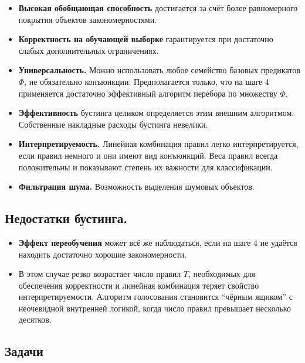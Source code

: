\begin{itemize}
    \item \textbf{Высокая обобщающая способность} достигается за счёт более равномерного покрытия объектов закономерностями.

    \item \textbf{Корректность на обучающей выборке} гарантируется при достаточно слабых дополнительных ограничениях.

    \item \textbf{Универсальность.} Можно использовать любое семейство базовых предикатов $\Phi$, не обязательно конъюнкции. Предполагается только, что на шаге 4 применяется достаточно эффективный алгоритм перебора по множеству $\Phi$.

    \item \textbf{Эффективность} бустинга целиком определяется этим внешним алгоритмом. Собственные накладные расходы бустинга невелики.

    \item \textbf{Интерпретируемость.} Линейная комбинация правил легко интерпретируется, если правил немного и они имеют вид конъюнкций. Веса правил всегда положительны и показывают степень их важности для классификации.

    \item \textbf{Фильтрация шума.} Возможность выделения шумовых объектов.
\end{itemize}

\subsection*{Недостатки бустинга.}

\begin{itemize}
    \item \textbf{Эффект переобучения} может всё же наблюдаться, если на шаге 4 не удаётся находить достаточно хорошие закономерности.

    \item В этом случае резко возрастает число правил $T$, необходимых для обеспечения корректности и линейная комбинация теряет свойство интерпретируемости. Алгоритм голосования становится ``чёрным ящиком'' с неочевидной внутренней логикой, когда число правил превышает несколько десятков.
\end{itemize}

\subsection{Задачи}

